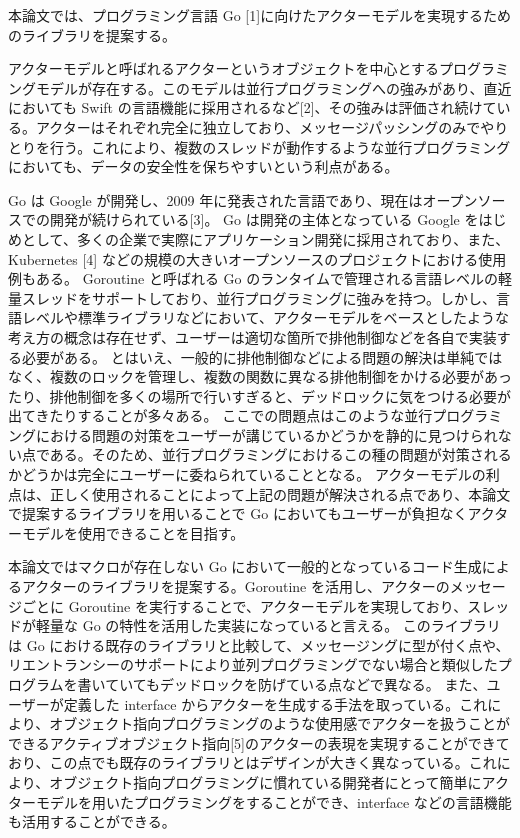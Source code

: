 本論文では、プログラミング言語 Go
{[}1{]}に向けたアクターモデルを実現するためのライブラリを提案する。

アクターモデルと呼ばれるアクターというオブジェクトを中心とするプログラミングモデルが存在する。このモデルは並行プログラミングへの強みがあり、直近においても
Swift
の言語機能に採用されるなど{[}2{]}、その強みは評価され続けている。アクターはそれぞれ完全に独立しており、メッセージパッシングのみでやりとりを行う。これにより、複数のスレッドが動作するような並行プログラミングにおいても、データの安全性を保ちやすいという利点がある。

Go は Google が開発し、2009
年に発表された言語であり、現在はオープンソースでの開発が続けられている{[}3{]}。
Go は開発の主体となっている Google
をはじめとして、多くの企業で実際にアプリケーション開発に採用されており、また、Kubernetes
{[}4{]}
などの規模の大きいオープンソースのプロジェクトにおける使用例もある。
Goroutine と呼ばれる Go
のランタイムで管理される言語レベルの軽量スレッドをサポートしており、並行プログラミングに強みを持つ。しかし、言語レベルや標準ライブラリなどにおいて、アクターモデルをベースとしたような考え方の概念は存在せず、ユーザーは適切な箇所で排他制御などを各自で実装する必要がある。
とはいえ、一般的に排他制御などによる問題の解決は単純ではなく、複数のロックを管理し、複数の関数に異なる排他制御をかける必要があったり、排他制御を多くの場所で行いすぎると、デッドロックに気をつける必要が出てきたりすることが多々ある。
ここでの問題点はこのような並行プログラミングにおける問題の対策をユーザーが講じているかどうかを静的に見つけられない点である。そのため、並行プログラミングにおけるこの種の問題が対策されるかどうかは完全にユーザーに委ねられていることとなる。
アクターモデルの利点は、正しく使用されることによって上記の問題が解決される点であり、本論文で提案するライブラリを用いることで
Go においてもユーザーが負担なくアクターモデルを使用できることを目指す。

本論文ではマクロが存在しない Go
において一般的となっているコード生成によるアクターのライブラリを提案する。Goroutine
を活用し、アクターのメッセージごとに Goroutine
を実行することで、アクターモデルを実現しており、スレッドが軽量な Go
の特性を活用した実装になっていると言える。 このライブラリは Go
における既存のライブラリと比較して、メッセージングに型が付く点や、リエントランシーのサポートにより並列プログラミングでない場合と類似したプログラムを書いていてもデッドロックを防げている点などで異なる。
また、ユーザーが定義した interface
からアクターを生成する手法を取っている。これにより、オブジェクト指向プログラミングのような使用感でアクターを扱うことができるアクティブオブジェクト指向{[}5{]}のアクターの表現を実現することができており、この点でも既存のライブラリとはデザインが大きく異なっている。これにより、オブジェクト指向プログラミングに慣れている開発者にとって簡単にアクターモデルを用いたプログラミングをすることができ、interface
などの言語機能も活用することができる。

